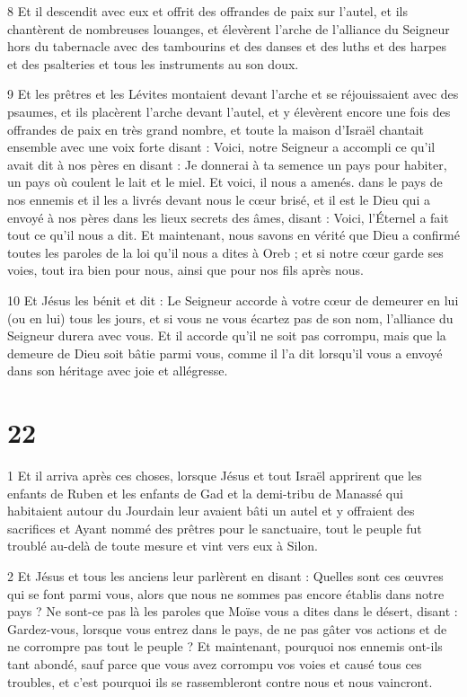 \par 8 Et il descendit avec eux et offrit des offrandes de paix sur l'autel, et ils chantèrent de nombreuses louanges, et élevèrent l'arche de l'alliance du Seigneur hors du tabernacle avec des tambourins et des danses et des luths et des harpes et des psalteries et tous les instruments au son doux.

\par 9 Et les prêtres et les Lévites montaient devant l'arche et se réjouissaient avec des psaumes, et ils placèrent l'arche devant l'autel, et y élevèrent encore une fois des offrandes de paix en très grand nombre, et toute la maison d'Israël chantait ensemble avec une voix forte disant : Voici, notre Seigneur a accompli ce qu'il avait dit à nos pères en disant : Je donnerai à ta semence un pays pour habiter, un pays où coulent le lait et le miel. Et voici, il nous a amenés. dans le pays de nos ennemis et il les a livrés devant nous le cœur brisé, et il est le Dieu qui a envoyé à nos pères dans les lieux secrets des âmes, disant : Voici, l'Éternel a fait tout ce qu'il nous a dit. Et maintenant, nous savons en vérité que Dieu a confirmé toutes les paroles de la loi qu'il nous a dites à Oreb ; et si notre cœur garde ses voies, tout ira bien pour nous, ainsi que pour nos fils après nous.

\par 10 Et Jésus les bénit et dit : Le Seigneur accorde à votre cœur de demeurer en lui (ou en lui) tous les jours, et si vous ne vous écartez pas de son nom, l'alliance du Seigneur durera avec vous. Et il accorde qu'il ne soit pas corrompu, mais que la demeure de Dieu soit bâtie parmi vous, comme il l'a dit lorsqu'il vous a envoyé dans son héritage avec joie et allégresse.



\chapter{22}

\par 1 Et il arriva après ces choses, lorsque Jésus et tout Israël apprirent que les enfants de Ruben et les enfants de Gad et la demi-tribu de Manassé qui habitaient autour du Jourdain leur avaient bâti un autel et y offraient des sacrifices et Ayant nommé des prêtres pour le sanctuaire, tout le peuple fut troublé au-delà de toute mesure et vint vers eux à Silon.

\par 2 Et Jésus et tous les anciens leur parlèrent en disant : Quelles sont ces œuvres qui se font parmi vous, alors que nous ne sommes pas encore établis dans notre pays ? Ne sont-ce pas là les paroles que Moïse vous a dites dans le désert, disant : Gardez-vous, lorsque vous entrez dans le pays, de ne pas gâter vos actions et de ne corrompre pas tout le peuple ? Et maintenant, pourquoi nos ennemis ont-ils tant abondé, sauf parce que vous avez corrompu vos voies et causé tous ces troubles, et c'est pourquoi ils se rassembleront contre nous et nous vaincront.

